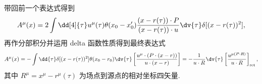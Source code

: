 \documentclass[12pt]{article}
\begin{document}
带回前一个表达式得到
\begin{equation*}
  A^{\mu}(x) = 2 \int \dd[4]{\tau} u^{\mu}(\tau) \theta(x_0 - x'_0) \frac{(x - r(\tau)) \cdot P}{(x - r(\tau)) \cdot u} \dv{\tau} \delta[(x - r(\tau))^2],
\end{equation*}
再作分部积分并运用 delta 函数性质得到最终表达式
\begin{equation*}
  A^{\mu}(x) = -\int \dd{\tau} \delta[(x - r(\tau))^2] \theta(x_0 - r_0) \dv{\tau}\left[\frac{u^{\mu} \cdot (P \cdot (x - r))}{u \cdot (x - r)}\right] = -\frac{1}{u \cdot R} \dv{\tau} \left[\frac{u^{\mu (P \cdot R)}}{u \cdot R}\right]_{\mathrm{ret}},
\end{equation*}
其中 $R^{\mu} = x^{\mu} - r^{\mu}(\tau)$ 为场点到源点的相对坐标四矢量. 
\end{document}
